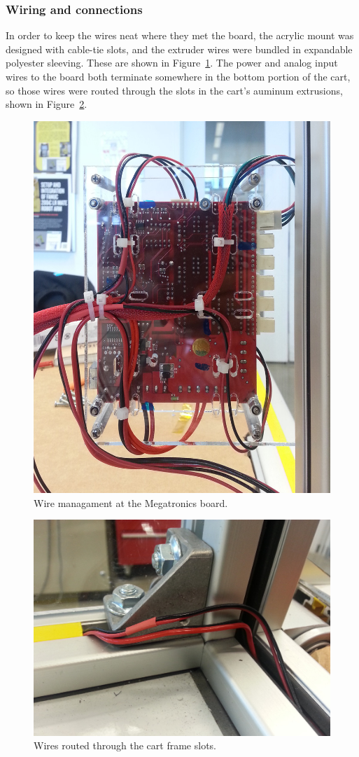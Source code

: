 \subsubsection{Wiring and connections}
In order to keep the wires neat where they met the board, the acrylic mount was designed with cable-tie slots, and the extruder wires were bundled in expandable polyester sleeving. These are shown in Figure~\ref{fig:mega-back}. The power and analog input wires to the board both terminate somewhere in the bottom portion of the cart, so those wires were routed through the slots in the cart's auminum extrusions, shown in Figure~\ref{fig:frame-wire-route}.

\begin{figure}
    \centering
    \includegraphics[width=.5\linewidth]{figures/megatronics-back}
    \caption{Wire managament at the Megatronics board.}
    \label{fig:mega-back}
\end{figure}

\begin{figure}
    \centering
    \includegraphics[width=.8\linewidth]{figures/frame-wire-route}
    \caption{Wires routed through the cart frame slots.}
    \label{fig:frame-wire-route}
\end{figure}

